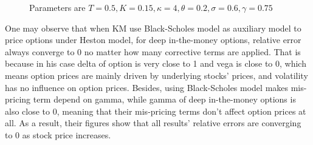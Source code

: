 \begin{figure}[ht]
    \centering
    \hfill
    \caption{Parameters are $T=0.5,K=0.15, \kappa=4,\theta=0.2, \sigma=0.6, \gamma=0.75$}
\end{figure}


One may observe that when KM use Black-Scholes model as auxiliary model to price options under Heston model, for deep in-the-money options, relative error always converge to 0 no matter how many corrective terms are applied. That is because in his case delta of option is very close to 1 and vega is close to 0, which means option prices are mainly driven by underlying stocks' prices, and volatility has no influence on option prices. Besides, using Black-Scholes model makes mis-pricing term depend on gamma, while gamma of deep in-the-money options is also close to 0, meaning that their mis-pricing terms don't affect option prices at all. As a result, their figures show that all results' relative errors are converging to 0 as stock price increases.

